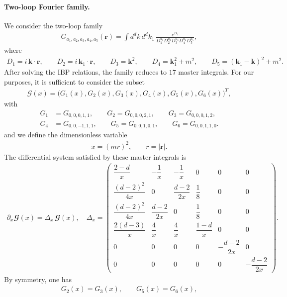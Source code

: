 \paragraph{Two-loop Fourier family.}
We consider the two-loop family
\begin{align}
G_{a_1,a_2,a_3,a_4,a_5}(\boldsymbol{r})
=
\int d^d k\, d^d k_1\,
\frac{e^{D_1}}{D_1^{a_1} D_2^{a_2} D_3^{a_3} D_4^{a_4} D_5^{a_5}},
\end{align}
where
\begin{align}
D_1 = i\,\boldsymbol{k}\!\cdot\!\boldsymbol{r},
\qquad
D_2 = i\,\boldsymbol{k}_1\!\cdot\!\boldsymbol{r},
\qquad
D_3 = \boldsymbol{k}^2,
\qquad
D_4 = \boldsymbol{k}_1^2 + m^2,
\qquad
D_5 = (\boldsymbol{k}_1-\boldsymbol{k})^2 + m^2.
\end{align}
After solving the IBP relations, the family reduces to $17$ master integrals. For our purposes, it is sufficient to consider the subset
\begin{align}
\mathcal G(x)
=
\bigl(
G_1(x),G_2(x),G_3(x),G_4(x),G_5(x),G_6(x)
\bigr)^T,
\end{align}
with
\begin{align}
G_1 &= G_{0,0,0,1,1},
\qquad
G_2 = G_{0,0,0,2,1},
\qquad
G_3 = G_{0,0,0,1,2},
\\
G_4 &= G_{0,0,-1,1,1},
\qquad
G_5 = G_{0,0,1,0,1},
\qquad
G_6 = G_{0,0,1,1,0}.
\end{align}
and we define the dimensionless variable
\begin{align}
x = (m r)^2,
\qquad r = |\boldsymbol{r}|.
\end{align}
The differential system satisfied by these master integrals is
\begin{align}
\partial_x \mathbfcal G(x) = \Delta_x\, \mathbfcal G(x),\quad \Delta_x =
\begin{pmatrix}
\dfrac{2-d}{x} & -\dfrac{1}{x} & -\dfrac{1}{x} & 0 & 0 & 0 \\[6pt]
\dfrac{(d-2)^2}{4x} & 0 & \dfrac{d-2}{2x} & \dfrac{1}{8} & 0 & 0 \\[6pt]
\dfrac{(d-2)^2}{4x} & \dfrac{d-2}{2x} & 0 & \dfrac{1}{8} & 0 & 0 \\[6pt]
\dfrac{2(d-3)}{x} & \dfrac{4}{x} & \dfrac{4}{x} & \dfrac{1-d}{x} & 0 & 0 \\[6pt]
0 & 0 & 0 & 0 & -\dfrac{d-2}{2x} & 0 \\[6pt]
0 & 0 & 0 & 0 & 0 & -\dfrac{d-2}{2x}
\end{pmatrix}.
\end{align}
By symmetry, one has
\begin{align}
G_2(x)=G_3(x),
\qquad
G_5(x)=G_6(x),
\end{align}
